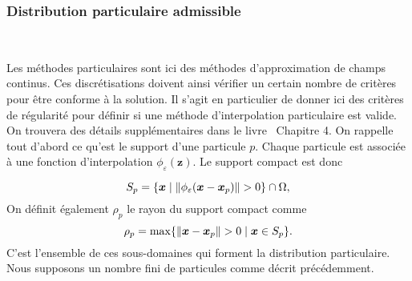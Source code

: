 \subsubsection{Distribution particulaire admissible}~\label{sec:part_admissible}

Les méthodes particulaires sont ici des méthodes d'approximation de champs continus. Ces discrétisations doivent ainsi vérifier un certain nombre de critères pour être conforme à la solution. Il s'agit en particulier de donner ici des critères de régularité pour définir si une méthode d'interpolation particulaire est valide. On trouvera des détails supplémentaires dans le livre~\cite{s_li_meshfree_2004} Chapitre 4. On rappelle tout d'abord ce qu'est le support d'une particule $p$. Chaque particule est associée à une fonction d'interpolation $\phi_\varepsilon(\bm{z})$. Le support compact est donc

\begin{equation*}
    S_p = \{\bm{x} \mid \| \phi_\varepsilon (\bm{x} - \bm{x}_p) \| > 0\} \cap \Omega,
\end{equation*}On définit également $\rho_p$ le rayon du support compact comme
\begin{equation*}
    \rho_p =  \max \{\| \bm{x} - \bm{x}_p \| > 0 \mid \bm{x} \in S_p\}.
\end{equation*}C'est l'ensemble de ces sous-domaines qui forment la distribution particulaire. Nous supposons un nombre fini de particules comme décrit précédemment.%

